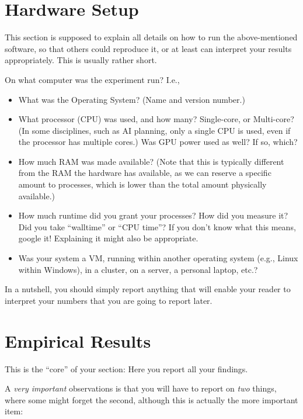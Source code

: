 \section{Hardware Setup}

This section is supposed to explain all details on how to run the above-mentioned software, so that others could reproduce it, or at least can interpret your results appropriately. This is usually rather short.

On what computer was the experiment run? I.e., 
\begin{itemize}
  \item What was the Operating System? (Name and version number.)
  \item What processor (CPU) was used, and how many? Single-core, or Multi-core? (In some disciplines, such as AI planning, only a single CPU is used, even if the processor has multiple cores.) Was GPU power used as well? If so, which?
  \item How much RAM was made available? (Note that this is typically different from the RAM the hardware has available, as we can reserve a specific amount to processes, which is lower than the total amount physically available.)
  \item How much runtime did you grant your processes? How did you measure it? Did you take ``walltime'' or ``CPU time''? If you don't know what this means, google it! Explaining it might also be appropriate.
  \item Was your system a VM, running within another operating system (e.g., Linux within Windows), in a cluster, on a server, a personal laptop, etc.?
\end{itemize}

In a nutshell, you should simply report anything that will enable your reader to interpret your numbers that you are going to report later. 


\section{Empirical Results}

This is the ``core'' of your section: Here you report all your findings. 

A \emph{very important} observations is that you will have to report on \emph{two} things, where some might forget the second, although this is actually the more important item:

